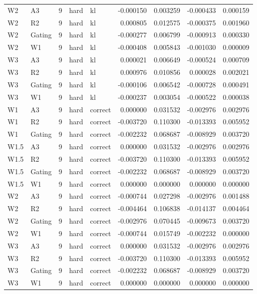 \begin{tabular}{llrllrrrr}
W2 & A3 & 9 & hard & kl & -0.000150 & 0.003259 & -0.000433 & 0.000159 \\
W2 & R2 & 9 & hard & kl & 0.000805 & 0.012575 & -0.000375 & 0.001960 \\
W2 & Gating & 9 & hard & kl & -0.000277 & 0.006799 & -0.000913 & 0.000330 \\
W2 & W1 & 9 & hard & kl & -0.000408 & 0.005843 & -0.001030 & 0.000009 \\
W3 & A3 & 9 & hard & kl & 0.000021 & 0.006649 & -0.000524 & 0.000709 \\
W3 & R2 & 9 & hard & kl & 0.000976 & 0.010856 & 0.000028 & 0.002021 \\
W3 & Gating & 9 & hard & kl & -0.000106 & 0.006542 & -0.000728 & 0.000491 \\
W3 & W1 & 9 & hard & kl & -0.000237 & 0.003054 & -0.000522 & 0.000038 \\
W1 & A3 & 9 & hard & correct & 0.000000 & 0.031532 & -0.002976 & 0.002976 \\
W1 & R2 & 9 & hard & correct & -0.003720 & 0.110300 & -0.013393 & 0.005952 \\
W1 & Gating & 9 & hard & correct & -0.002232 & 0.068687 & -0.008929 & 0.003720 \\
W1.5 & A3 & 9 & hard & correct & 0.000000 & 0.031532 & -0.002976 & 0.002976 \\
W1.5 & R2 & 9 & hard & correct & -0.003720 & 0.110300 & -0.013393 & 0.005952 \\
W1.5 & Gating & 9 & hard & correct & -0.002232 & 0.068687 & -0.008929 & 0.003720 \\
W1.5 & W1 & 9 & hard & correct & 0.000000 & 0.000000 & 0.000000 & 0.000000 \\
W2 & A3 & 9 & hard & correct & -0.000744 & 0.027298 & -0.002976 & 0.001488 \\
W2 & R2 & 9 & hard & correct & -0.004464 & 0.106838 & -0.014137 & 0.004464 \\
W2 & Gating & 9 & hard & correct & -0.002976 & 0.070445 & -0.009673 & 0.003720 \\
W2 & W1 & 9 & hard & correct & -0.000744 & 0.015749 & -0.002232 & 0.000000 \\
W3 & A3 & 9 & hard & correct & 0.000000 & 0.031532 & -0.002976 & 0.002976 \\
W3 & R2 & 9 & hard & correct & -0.003720 & 0.110300 & -0.013393 & 0.005952 \\
W3 & Gating & 9 & hard & correct & -0.002232 & 0.068687 & -0.008929 & 0.003720 \\
W3 & W1 & 9 & hard & correct & 0.000000 & 0.000000 & 0.000000 & 0.000000 \\

\end{tabular}
